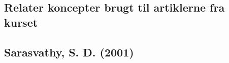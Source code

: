 \documentclass[a4paper]{article}
\begin{document}






\label{paradigme}


\subsection{Relater koncepter brugt til artiklerne fra kurset}

\subsection{Sarasvathy, S. D. (2001)}




\printbibliography[heading=bibintoc]
\end{document}
